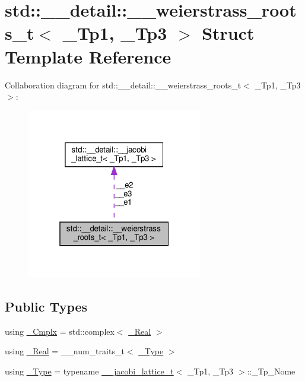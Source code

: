 \hypertarget{structstd_1_1____detail_1_1____weierstrass__roots__t}{}\section{std\+:\+:\+\_\+\+\_\+detail\+:\+:\+\_\+\+\_\+weierstrass\+\_\+roots\+\_\+t$<$ \+\_\+\+Tp1, \+\_\+\+Tp3 $>$ Struct Template Reference}
\label{structstd_1_1____detail_1_1____weierstrass__roots__t}


Collaboration diagram for std\+:\+:\+\_\+\+\_\+detail\+:\+:\+\_\+\+\_\+weierstrass\+\_\+roots\+\_\+t$<$ \+\_\+\+Tp1, \+\_\+\+Tp3 $>$\+:
\nopagebreak
\begin{figure}[H]
\begin{center}
\leavevmode
\includegraphics[width=217pt]{structstd_1_1____detail_1_1____weierstrass__roots__t__coll__graph}
\end{center}
\end{figure}
\subsection*{Public Types}
\begin{DoxyCompactItemize}
\item 
using \hyperlink{structstd_1_1____detail_1_1____weierstrass__roots__t_aac17f2bddcbd8c9ed8cc5ab8c44df622}{\+\_\+\+Cmplx} = std\+::complex$<$ \hyperlink{structstd_1_1____detail_1_1____weierstrass__roots__t_a37df115993982e284c018276d175a53c}{\+\_\+\+Real} $>$
\item 
using \hyperlink{structstd_1_1____detail_1_1____weierstrass__roots__t_a37df115993982e284c018276d175a53c}{\+\_\+\+Real} = \+\_\+\+\_\+num\+\_\+traits\+\_\+t$<$ \hyperlink{structstd_1_1____detail_1_1____weierstrass__roots__t_acda3e0386962aea322dea870977b67ed}{\+\_\+\+Type} $>$
\item 
using \hyperlink{structstd_1_1____detail_1_1____weierstrass__roots__t_acda3e0386962aea322dea870977b67ed}{\+\_\+\+Type} = typename \hyperlink{structstd_1_1____detail_1_1____jacobi__lattice__t}{\+\_\+\+\_\+jacobi\+\_\+lattice\+\_\+t}$<$ \+\_\+\+Tp1, \+\_\+\+Tp3 $>$\+::\+\_\+\+Tp\+\_\+\+Nome
\end{DoxyCompactItemize}
